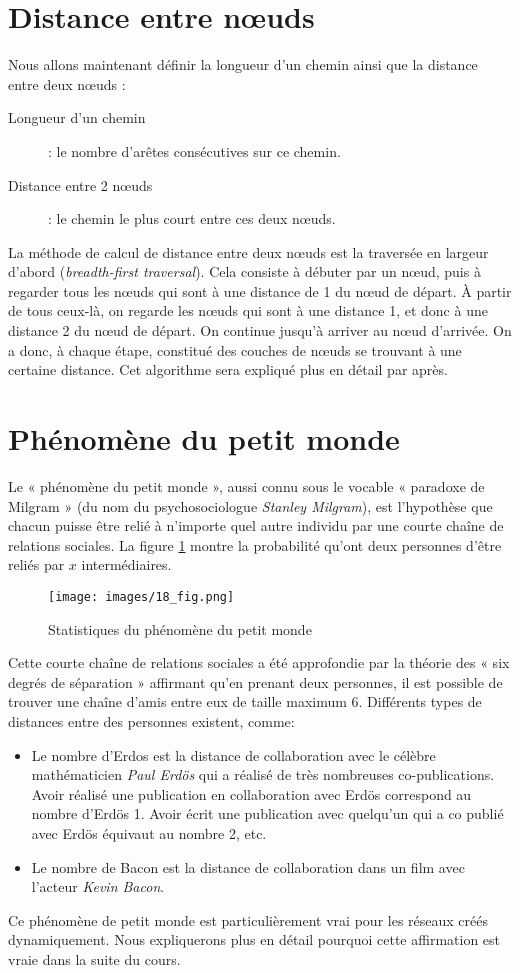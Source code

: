 \section{Distance entre n\oe uds}
Nous allons maintenant définir la longueur d'un chemin ainsi que la distance entre deux n\oe uds :
\begin{description}
\item[Longueur d'un chemin] : le nombre d'arêtes consécutives sur ce chemin.
\item [Distance entre 2 n\oe uds] : le chemin le plus court entre ces deux n\oe uds.
\end{description}

La méthode de calcul de distance entre deux n\oe uds est la traversée en largeur d'abord (\emph{breadth-first traversal}). Cela consiste à débuter par un n\oe ud, puis à regarder tous les n\oe uds qui sont à une distance de 1 du n\oe ud de départ. À partir de tous ceux-là, on regarde les n\oe uds qui sont à une distance 1, et donc à une distance 2 du n\oe ud de départ. On continue jusqu'à arriver au n\oe ud d'arrivée. On a donc, à chaque étape, constitué des couches de n\oe uds se trouvant à une certaine distance. Cet algorithme sera expliqué plus en détail par après.\\

\section{Phénomène du petit monde}
Le « phénomène du petit monde », aussi connu sous le vocable « paradoxe de Milgram » (du nom du psychosociologue  \textit{Stanley Milgram}), est l'hypothèse que chacun puisse être relié à n'importe quel autre individu par une courte chaîne de relations sociales. La figure \ref{petit_monde} montre la probabilité qu'ont deux personnes d'être reliés par $x$ intermédiaires. 
	\begin{figure}
	\center
	\texttt{[image: images/18\_fig.png]}
	\caption{\label{petit_monde} Statistiques du phénomène du petit monde}
	\end{figure}
Cette  courte chaîne de relations sociales a été approfondie par la théorie des « six degrés de séparation » affirmant qu'en prenant deux personnes, il est possible de trouver une chaîne d'amis entre eux de taille maximum 6.
Différents types de distances entre des personnes existent, comme:
	\begin{itemize}
	\item Le nombre d'Erdos est la distance de collaboration avec le célèbre mathématicien  \textit{Paul Erdös} qui a réalisé de très nombreuses co-publications. Avoir réalisé une publication en collaboration avec Erdös correspond au nombre d'Erdös 1. Avoir écrit une publication avec quelqu'un qui a co publié avec Erdös équivaut au nombre 2, etc.
	\item Le nombre de Bacon est la distance de collaboration dans un film avec l'acteur  \textit{Kevin Bacon}.
	\end{itemize}
Ce phénomène de petit monde est particulièrement vrai pour les réseaux créés dynamiquement. Nous expliquerons plus en détail pourquoi cette affirmation est vraie dans la suite du cours.

